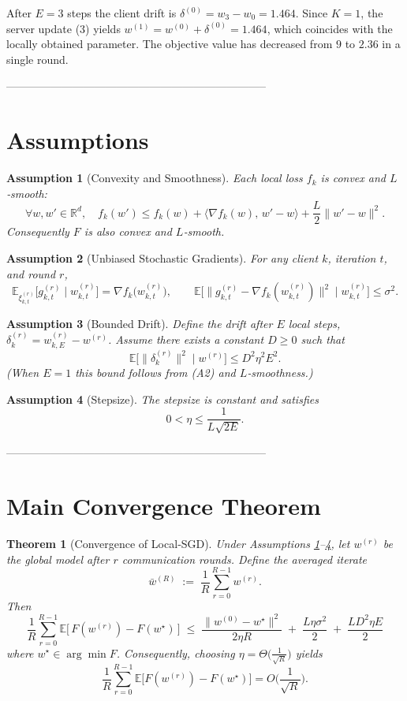 \documentclass{article}
\newtheorem{theorem}{Theorem}
\newtheorem{assumption}{Assumption}
\newcommand{\E}{\mathbb{E}}
\newcommand{\R}{\mathbb{R}}
\begin{document}
After $E=3$ steps the client drift is $\delta^{(0)} = w_{3}-w_0 = 1.464$.
Since $K=1$, the server update (3) yields $w^{(1)} = w^{(0)}+\delta^{(0)} = 1.464$,
which coincides with the locally obtained parameter. The objective value
has decreased from $9$ to $2.36$ in a single round.

-----------------------------------------------------------------------

\section*{Assumptions}
\begin{assumption}[Convexity and Smoothness]\label{as:convex}
Each local loss $f_k$ is convex and $L$‑smooth:
\[
\forall w,w'\in\R^{d},\quad 
f_k(w')\le f_k(w)+\langle\nabla f_k(w),\,w'-w\rangle
+\frac{L}{2}\|w'-w\|^{2}.
\tag{A1}
\]
Consequently $F$ is also convex and $L$‑smooth.
\end{assumption}

\begin{assumption}[Unbiased Stochastic Gradients]\label{as:unbiased}
For any client $k$, iteration $t$, and round $r$,
\[
\E_{\xi_{k,t}^{(r)}}\!\big[g_{k,t}^{(r)}\mid w_{k,t}^{(r)}\big]
= \nabla f_k\!\big(w_{k,t}^{(r)}\big),
\qquad
\E\!\big[\|g_{k,t}^{(r)}-\nabla f_k(w_{k,t}^{(r)})\|^{2}\mid w_{k,t}^{(r)}\big]
\le \sigma^{2}.
\tag{A2}
\]
\end{assumption}

\begin{assumption}[Bounded Drift]\label{as:drift}
Define the drift after $E$ local steps,
$\delta_k^{(r)} = w_{k,E}^{(r)}-w^{(r)}$.
Assume there exists a constant $D\ge0$ such that
\[
\E\!\big[\|\delta_k^{(r)}\|^{2}\mid w^{(r)}\big]\le D^{2}\eta^{2}E^{2}.
\tag{A3}
\]
(When $E=1$ this bound follows from (A2) and $L$‑smoothness.)
\end{assumption}

\begin{assumption}[Stepsize]\label{as:stepsize}
The stepsize is constant and satisfies
\[
0<\eta\le\frac{1}{L\sqrt{2E}} .
\tag{A4}
\]
\end{assumption}

-----------------------------------------------------------------------

\section*{Main Convergence Theorem}
\begin{theorem}[Convergence of Local‑SGD]\label{thm:main}
Under Assumptions \ref{as:convex}–\ref{as:stepsize},
let $w^{(r)}$ be the global model after $r$ communication rounds.
Define the averaged iterate
\[
\bar w^{(R)} \;:=\; \frac1R\sum_{r=0}^{R-1} w^{(r)} .
\]
Then
\[
\boxed{
\frac{1}{R}\sum_{r=0}^{R-1}\E\!\big[\,F(w^{(r)})-F(w^\star)\,\big]
\;\le\;
\frac{\|w^{(0)}-w^\star\|^{2}}{2\eta R}
   \;+\;
\frac{L\eta\sigma^{2}}{2}
   \;+\;
\frac{L D^{2}\eta E}{2}
}
\tag{4}
\]
where $w^\star\in\arg\min F$.
Consequently, choosing $\eta = \Theta\!\big(\frac{1}{\sqrt{R}}\big)$ yields
\[
\frac{1}{R}\sum_{r=0}^{R-1}\E\!\big[F(w^{(r)})-F(w^\star)\big]
= O\!\Big(\frac{1}{\sqrt{R}}\Big).
\]
\end{theorem}
\end{document}
